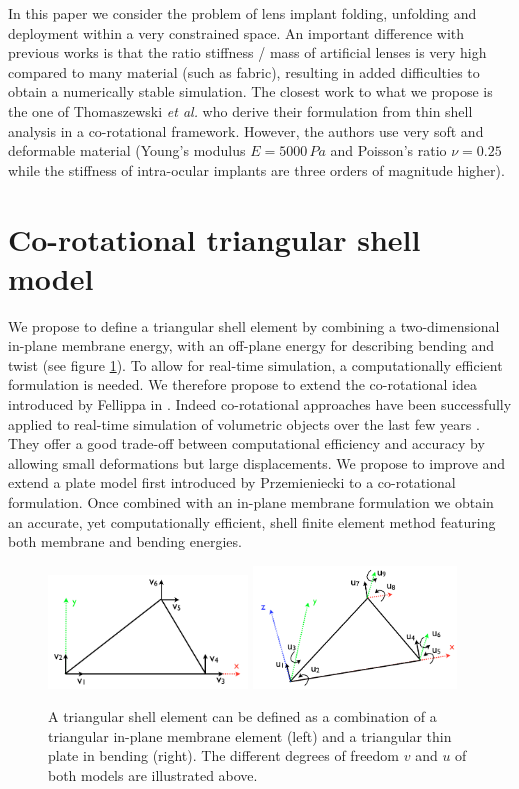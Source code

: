 \documentclass{llncs}
\begin{document}
In this paper we consider the problem of lens implant folding, unfolding and deployment within a very constrained space. An important difference with previous works is that the ratio stiffness / mass of artificial lenses is very high compared to many material (such as fabric), resulting in added difficulties to obtain a numerically stable simulation. The closest work to what we propose is the one of Thomaszewski \emph{et al.} \cite{Thomaszewski06} who derive their formulation from thin shell analysis in a co-rotational framework. However, the authors use very soft and deformable material (Young's modulus $E = 5000\,Pa$ and Poisson's ratio $\nu = 0.25$ while the stiffness of intra-ocular implants are three orders of magnitude higher).

\section{Co-rotational triangular shell model}

We propose to define a triangular shell element by combining a two-dimensional in-plane membrane energy, with an off-plane energy for describing bending and twist (see figure \ref{fig-triangle}). To allow for real-time simulation, a computationally efficient formulation is needed. We therefore propose to extend the co-rotational idea introduced by Fellippa in \cite{Felippa00}. Indeed co-rotational approaches have been successfully applied to real-time simulation of volumetric objects over the last few years \cite{Muller04}. They offer a good trade-off between computational efficiency and accuracy by allowing small deformations but large displacements. We propose to improve and extend a plate model first introduced by Przemieniecki \cite{Przemieniecki68} to a co-rotational formulation. Once combined with an in-plane membrane formulation we obtain an accurate, yet computationally efficient, shell finite element method featuring both membrane and bending energies. 

\begin{figure}
\centering
\includegraphics[height=3cm]{images/triangle_membrane}
\hspace{1cm}
\includegraphics[height=3.25cm]{images/triangle_bending}
\caption {A triangular shell element can be defined as a combination of a triangular in-plane membrane element (left) and a triangular thin plate in bending (right). The different degrees of freedom $v$ and $u$ of both models are illustrated above.}
\label{fig-triangle}
\end{figure}
\end{document}
